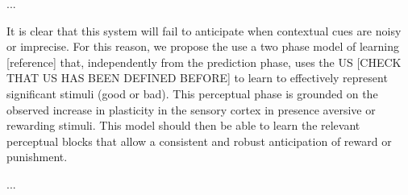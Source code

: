 \documentclass[letterpaper, 10 pt, conference]{ieeeconf}  %
\begin{document}
...

It is clear that this system will fail to anticipate when contextual cues are noisy or imprecise. For this reason, we propose the use a two phase model of learning [reference] that, independently from the prediction phase, uses the US [CHECK THAT US HAS BEEN DEFINED BEFORE] to learn to effectively represent significant stimuli (good or bad). This perceptual phase is grounded on the observed increase in plasticity in the sensory cortex in presence aversive or rewarding stimuli. This model should then be able to learn the relevant perceptual blocks that allow a consistent and robust anticipation of reward or punishment. 

...

\addtolength{\textheight}{-12cm}   %
\end{document}
